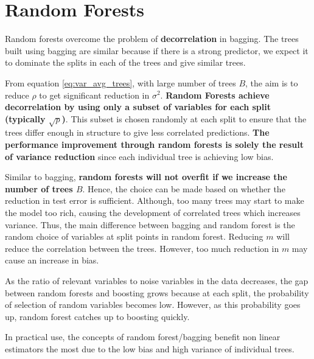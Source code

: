 \documentclass[../statistical_learning_notes.tex]{subfiles}
\begin{document}
    \section{Random Forests}
    Random forests overcome the problem of \textbf{decorrelation} in bagging. The trees built using bagging are similar because if there is a strong predictor, we expect it to dominate the splits in each of the trees and give similar trees.\newline
    
    From equation \ref{eq:var_avg_trees}, with large number of trees $B$, the aim is to reduce $\rho$ to get significant reduction in $\sigma^{2}$. \textbf{Random Forests achieve decorrelation by using only a subset of variables for each split (typically $\sqrt{p}$)}. This subset is chosen randomly at each split to ensure that the trees differ enough in structure to give less correlated predictions. \textbf{The performance improvement through random forests is solely the result of variance reduction} since each individual tree is achieving low bias.\newline

    Similar to bagging, \textbf{random forests will not overfit if we increase the number of trees $B$}. Hence, the choice can be made based on whether the reduction in test error is sufficient. Although, too many trees may start to make the model too rich, causing the development of correlated trees which increases variance. Thus, the main difference between bagging and random forest is the random choice of variables at split points in random forest. Reducing $m$ will reduce the correlation between the trees. However, too much reduction in $m$ may cause an increase in bias.\newline

    As the ratio of relevant variables to noise variables in the data decreases, the gap between random forests and boosting grows because at each split, the probability of selection of random variables becomes low. However, as this probability goes up, random forest catches up to boosting quickly.\newline

    In practical use, the concepts of random forest/bagging benefit non linear estimators the most due to the low bias and high variance of individual trees.
\end{document}
